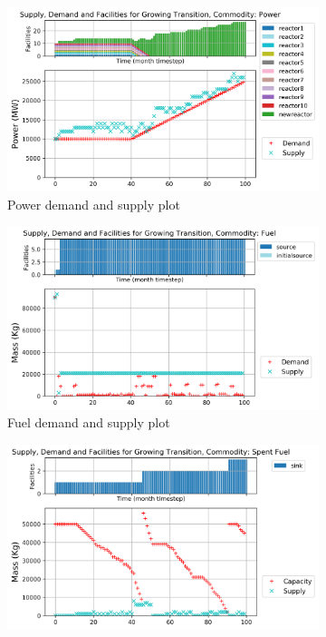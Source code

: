 \documentclass{anstrans}
\begin{document}
\begin{figure}[!htbp]
    \centering
    \begin{subfigure}[t]{\textwidth}
    \centering
        \includegraphics[width=0.9\linewidth]{figures/growingtransition-power.png} 
        \caption{Power demand and supply plot}
        \label{fig:growingtransition-power}
    \end{subfigure}
    \vspace{1cm}
    \begin{subfigure}[t]{0.45\textwidth}
        \centering
        \includegraphics[width=\linewidth]{figures/growingtransition-fuel.png} 
        \caption{Fuel demand and supply plot}
	    \label{fig:growingtransition-fuel}
    \end{subfigure}
    \hfill
    \begin{subfigure}[t]{0.45\textwidth}
        \centering
        \includegraphics[width=\linewidth]{figures/growingtransition-spentfuel.png} 

\end{subfigure}
\end{figure}
\end{document}

